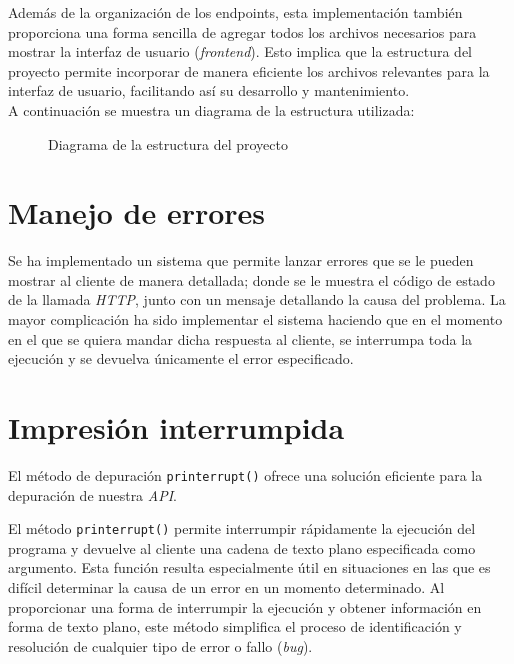 \documentclass[12pt]{report}
\begin{document}
Además de la organización de los endpoints, esta implementación también proporciona una forma sencilla de agregar todos los archivos necesarios para mostrar la interfaz de usuario (\emph{frontend}). Esto implica que la estructura del proyecto permite incorporar de manera eficiente los archivos relevantes para la interfaz de usuario, facilitando así su desarrollo y mantenimiento.
\\

A continuación se muestra un diagrama de la estructura utilizada:
\begin{figure}[H]
    \centering
{}
\caption{Diagrama de la estructura del proyecto}
\label{fig:arbol_estructura}
\end{figure}

\section{Manejo de errores}
Se ha implementado un sistema que permite lanzar errores que se le pueden mostrar al cliente de manera detallada; donde se le muestra el código de estado de la llamada \textit{HTTP}, junto con un mensaje detallando la causa del problema. La mayor complicación ha sido implementar el sistema haciendo que en el momento en el que se quiera mandar dicha respuesta al cliente, se interrumpa toda la ejecución y se devuelva únicamente el error especificado.

\section{Impresión interrumpida}
El método de depuración \texttt{printerrupt()} ofrece una solución eficiente para la depuración de nuestra \textit{API}.

El método \texttt{printerrupt()} permite interrumpir rápidamente la ejecución del programa y devuelve al cliente una cadena de texto plano especificada como argumento. Esta función resulta especialmente útil en situaciones en las que es difícil determinar la causa de un error en un momento determinado. Al proporcionar una forma de interrumpir la ejecución y obtener información en forma de texto plano, este método simplifica el proceso de identificación y resolución de cualquier tipo de error o fallo (\emph{bug}).
\end{document}
